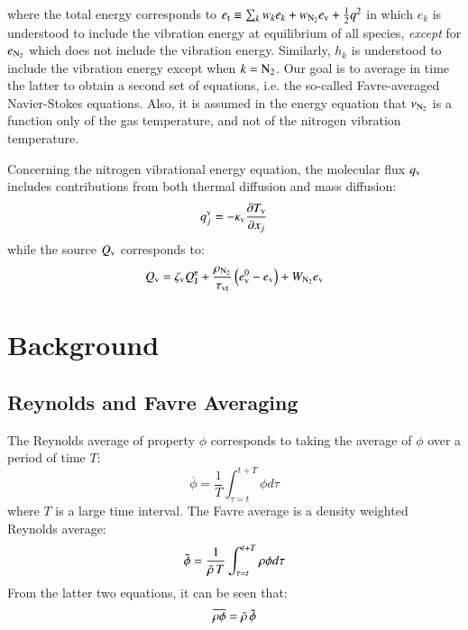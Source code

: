 \documentclass{warpdoc}
\newcommand{\ev}{e_{\rm v}}
\newcommand{\cNtwo}{w_{\rm N_2}}
\newcommand{\et}{{e_{\rm t}}}
\begin{document}
%
%
where the total energy corresponds to $\et\equiv \sum_k w_k e_k + \cNtwo \ev+ \frac{1}{2} q^2$ in which $e_k$ is understood to include the vibration energy at equilibrium of all species, \emph{except} for $e_{\rm N_2}$ which does not include the vibration energy. Similarly, $h_k$ is understood to include the vibration energy except when $k={\rm N_2}$. Our goal is to average in time the latter to obtain a second set of
equations, i.e. the so-called Favre-averaged Navier-Stokes equations. Also, it is assumed in the energy equation that $\nu_{\rm N_2}$ is a function only of the gas temperature, and not of the nitrogen vibration temperature.

Concerning the nitrogen vibrational energy equation, the molecular flux $q_{\rm v}$ includes contributions from both  thermal diffusion and mass diffusion:
%
\begin{equation}
q^{\rm v}_j= -\kappa_{\rm v} \frac{\partial T_{\rm v}}{\partial x_j} 
\end{equation}
%
while the source $Q_{\rm v}$ corresponds to:
%
\begin{equation}
Q_{\rm v}= \zeta_{\rm v} Q_{\rm J}^{\rm e} + \frac{\rho_{\rm N_2}}{\tau_{\rm vt}}\left(e_{\rm v}^0 -e_{\rm v}  \right) + W_{\rm N_2} e_{\rm v}
\end{equation}
%










\section{Background}


\subsection{Reynolds and Favre Averaging}

The Reynolds average of property $\phi$ corresponds to taking the average of
$\phi$ over a period of time $T$:
%
\begin{equation}
  \overline{\phi}=\frac{1}{T} \int_{\tau=t}^{t+T} \phi  d \tau
  \label{eqn:ReynoldsAverage}
\end{equation}
%
where $T$ is a large time interval. The Favre average is a density
weighted Reynolds average:
%
\begin{equation}
  {\tilde{\phi}}=\frac{1}{\bar{\rho}\, T} \int_{\tau=t}^{t+T} \rho \phi  d \tau
  \label{eqn:FavreAverage}
\end{equation}
%
From the latter two equations, it can be seen that:
%
\begin{equation}
  \overline{\rho  \phi}=\bar{\rho}\,  {\tilde{\phi}}
  \label{eqn:rhophi}
\end{equation}
%
\end{document}
